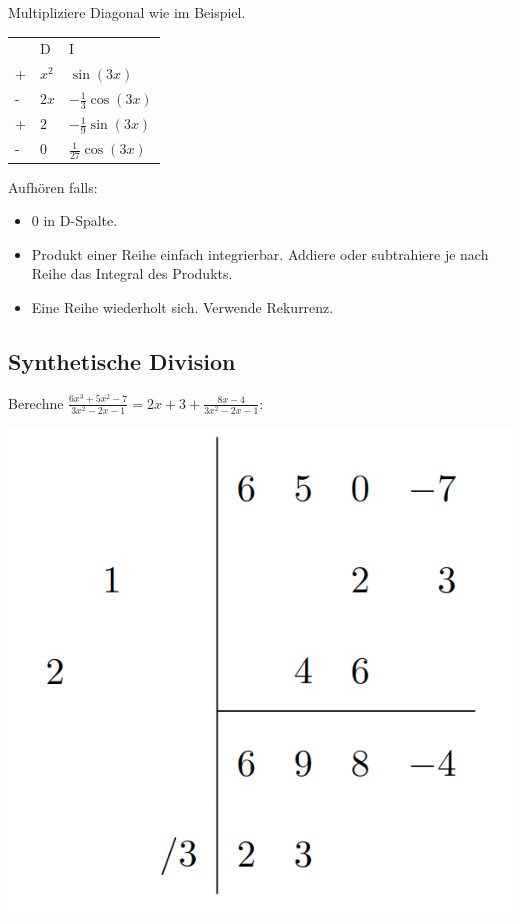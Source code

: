 \documentclass[a4paper,10pt]{article}
\begin{document}
Multipliziere Diagonal wie im Beispiel.

\begin{table}[h]
  \begin{tabular}{lll}
    & D & I \\
  + & $x^2$ & $\sin(3x)$  \\
  - & $2x$ & $-\frac{1}{3}\cos(3x)$  \\
  + & $2$ & $-\frac{1}{9}\sin(3x)$  \\
  - & $0$ & $\frac{1}{27}\cos(3x)$  
  \end{tabular}
\end{table}

Aufhören falls:
\begin{itemize}
  \item $0$ in D-Spalte.
  \item Produkt einer Reihe einfach integrierbar. Addiere oder subtrahiere je nach Reihe das Integral des Produkts.
  \item Eine Reihe wiederholt sich. Verwende Rekurrenz.
\end{itemize}

\subsection{Synthetische Division}
Berechne $\frac{6x^3 + 5x^2 - 7}{3x^2 - 2x - 1} = 2x + 3 + \frac{8x - 4}{3x^2 -2x - 1}$:\\
\begin{center}
  \includegraphics[width=0.4 \linewidth]{synthetic-division.png}
\end{center}

\endgroup
\end{document}
